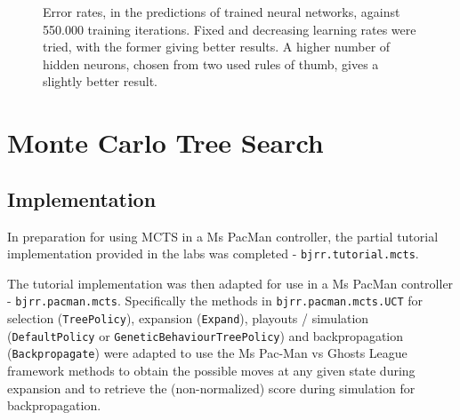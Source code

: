 \documentclass[conference]{IEEEtran}
\begin{document}
\begin{figure}
{}\qquad
{}\qquad
{}
\caption{Error rates, in the predictions of trained neural networks, against 550.000 training iterations.  Fixed and decreasing learning rates were tried, with the former giving better results.  A higher number of hidden neurons, chosen from two used rules of thumb, gives a slightly better result.}
\label{annTrainingEpochs}
\end{figure}



\section{Monte Carlo Tree Search}

\subsection{Implementation}

In preparation for using MCTS in a Ms PacMan controller, the partial tutorial implementation provided in the labs was completed - \texttt{bjrr.tutorial.mcts}.

The tutorial implementation was then adapted for use in a Ms PacMan controller - \texttt{bjrr.pacman.mcts}.  Specifically the methods in \texttt{bjrr.pacman.mcts.UCT} for selection (\texttt{TreePolicy}), expansion (\texttt{Expand}), playouts / simulation (\texttt{DefaultPolicy} or \texttt{GeneticBehaviourTreePolicy}) and backpropagation (\texttt{Backpropagate}) were adapted to use the Ms Pac-Man vs Ghosts League framework methods to obtain the possible moves at any given state during expansion and to retrieve the (non-normalized) score during simulation for backpropagation.
\end{document}
